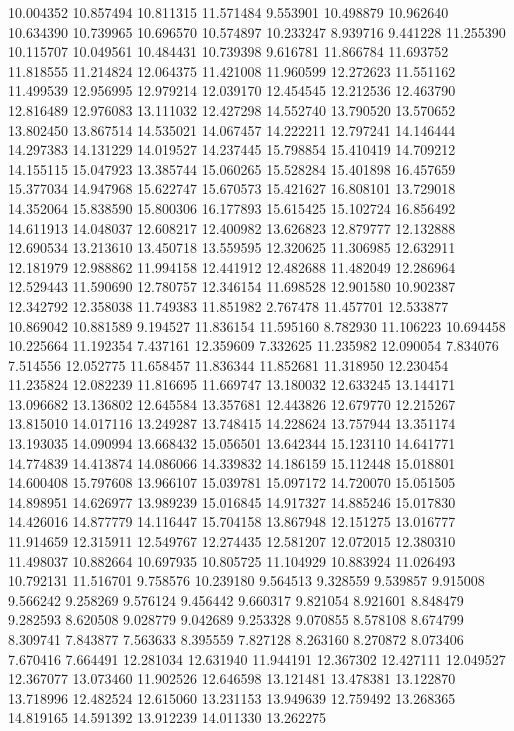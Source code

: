 10.004352
10.857494
10.811315
11.571484
9.553901
10.498879
10.962640
10.634390
10.739965
10.696570
10.574897
10.233247
8.939716
9.441228
11.255390
10.115707
10.049561
10.484431
10.739398
9.616781
11.866784
11.693752
11.818555
11.214824
12.064375
11.421008
11.960599
12.272623
11.551162
11.499539
12.956995
12.979214
12.039170
12.454545
12.212536
12.463790
12.816489
12.976083
13.111032
12.427298
14.552740
13.790520
13.570652
13.802450
13.867514
14.535021
14.067457
14.222211
12.797241
14.146444
14.297383
14.131229
14.019527
14.237445
15.798854
15.410419
14.709212
14.155115
15.047923
13.385744
15.060265
15.528284
15.401898
16.457659
15.377034
14.947968
15.622747
15.670573
15.421627
16.808101
13.729018
14.352064
15.838590
15.800306
16.177893
15.615425
15.102724
16.856492
14.611913
14.048037
12.608217
12.400982
13.626823
12.879777
12.132888
12.690534
13.213610
13.450718
13.559595
12.320625
11.306985
12.632911
12.181979
12.988862
11.994158
12.441912
12.482688
11.482049
12.286964
12.529443
11.590690
12.780757
12.346154
11.698528
12.901580
10.902387
12.342792
12.358038
11.749383
11.851982
2.767478
11.457701
12.533877
10.869042
10.881589
9.194527
11.836154
11.595160
8.782930
11.106223
10.694458
10.225664
11.192354
7.437161
12.359609
7.332625
11.235982
12.090054
7.834076
7.514556
12.052775
11.658457
11.836344
11.852681
11.318950
12.230454
11.235824
12.082239
11.816695
11.669747
13.180032
12.633245
13.144171
13.096682
13.136802
12.645584
13.357681
12.443826
12.679770
12.215267
13.815010
14.017116
13.249287
13.748415
14.228624
13.757944
13.351174
13.193035
14.090994
13.668432
15.056501
13.642344
15.123110
14.641771
14.774839
14.413874
14.086066
14.339832
14.186159
15.112448
15.018801
14.600408
15.797608
13.966107
15.039781
15.097172
14.720070
15.051505
14.898951
14.626977
13.989239
15.016845
14.917327
14.885246
15.017830
14.426016
14.877779
14.116447
15.704158
13.867948
12.151275
13.016777
11.914659
12.315911
12.549767
12.274435
12.581207
12.072015
12.380310
11.498037
10.882664
10.697935
10.805725
11.104929
10.883924
11.026493
10.792131
11.516701
9.758576
10.239180
9.564513
9.328559
9.539857
9.915008
9.566242
9.258269
9.576124
9.456442
9.660317
9.821054
8.921601
8.848479
9.282593
8.620508
9.028779
9.042689
9.253328
9.070855
8.578108
8.674799
8.309741
7.843877
7.563633
8.395559
7.827128
8.263160
8.270872
8.073406
7.670416
7.664491
12.281034
12.631940
11.944191
12.367302
12.427111
12.049527
12.367077
13.073460
11.902526
12.646598
13.121481
13.478381
13.122870
13.718996
12.482524
12.615060
13.231153
13.949639
12.759492
13.268365
14.819165
14.591392
13.912239
14.011330
13.262275
